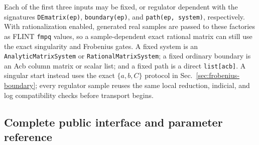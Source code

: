\documentclass[11pt]{article}
\begin{document}
Each of the first three inputs may be fixed, or regulator dependent with the signatures
\texttt{DEmatrix(ep)}, \texttt{boundary(ep)}, and \texttt{path(ep, system)}, respectively.
With rationalization enabled, generated real samples are passed to these factories as FLINT
\texttt{fmpq} values, so a sample-dependent exact rational matrix can still use the exact
singularity and Frobenius gates.  A fixed system is an \texttt{AnalyticMatrixSystem} or
\texttt{RationalMatrixSystem}; a fixed ordinary boundary is an Acb column matrix or scalar
list; and a fixed path is a direct \texttt{list[acb]}.  A singular start instead uses the
exact $\{a,b,C\}$ protocol in Sec.~\ref{sec:frobenius-boundary}; every regulator sample
reuses the same local reduction, indicial, and log compatibility checks before transport
begins.

\subsection{Complete public interface and parameter reference}
\label{sec:user-interface}
\label{subsec:public-interface}
\end{document}
